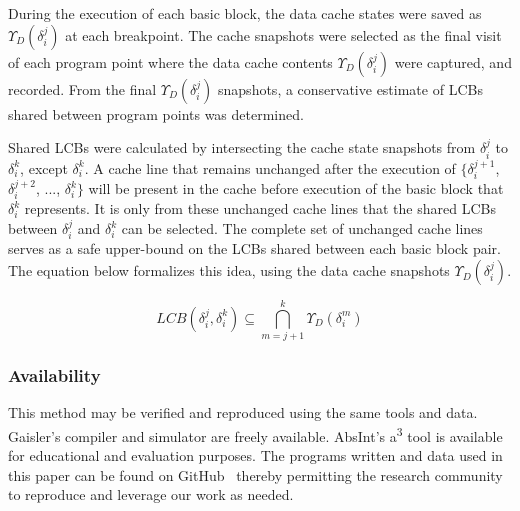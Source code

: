 During the execution of each basic block, the data cache states were saved as ${\Upsilon_D(\delta_i^j)}$ at each breakpoint.
The cache snapshots were selected as the final visit of each program point where the data cache contents ${\Upsilon_D(\delta_i^j)}$ were captured, and recorded. From the final ${\Upsilon_D(\delta_i^j)}$ snapshots, a conservative estimate of LCBs shared between program points was determined.
%

Shared LCBs were calculated by intersecting the cache state snapshots from ${\delta_i^j}$
to ${\delta_i^k}$, except ${\delta_i^k}$. A cache line that remains unchanged after
the execution of $\{{\delta_i^{j+1}}$, ${\delta_i^{j+2}}$, ..., ${\delta_i^{k}}\}$ will be present in the cache before execution of the basic block that ${\delta_i^k}$ represents. It is only from these unchanged cache lines that the shared LCBs between ${\delta_i^j}$ and ${\delta_i^k}$ can be selected. The complete set of
unchanged cache lines serves as a safe upper-bound on the LCBs shared between each basic block pair. The equation below formalizes this idea, using the data cache snapshots ${\Upsilon_D(\delta_i^j)}$.
\vspace{-20pt}
\begin{center}
  \begin{equation}
    LCB(\delta_i^j,\delta_i^k) \subseteq \bigcap_{m=j+1}^{k} {\Upsilon_D(\delta_i^m)}
  \end{equation}
\end{center}
\subsubsection{Availability}
This method may be verified and reproduced using the same tools and data. Gaisler's compiler and simulator are freely available. AbsInt's a\textsuperscript{3} tool is available for educational and evaluation purposes. The programs written and data used in this paper can be found on GitHub~\cite{tessler:14} thereby permitting the research community to reproduce and leverage our work as needed.
\newline
\vspace{-10pt}
